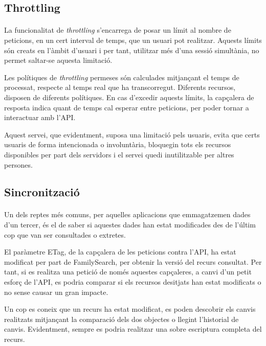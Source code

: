     \subsection{Throttling}

        \paragraph{}
        La funcionalitat de \emph{throttling} s'encarrega de posar un límit al nombre de peticions, en un cert interval de temps, que un usuari pot realitzar. Aquests límits són creats en l'àmbit d'usuari i per tant, utilitzar més d'una sessió simultània, no permet saltar-se aquesta limitació.

        Les polítiques de \emph{throttling} permeses són calculades mitjançant el temps de processat, respecte al temps real que ha transcorregut. Diferents recursos, disposen de diferents polítiques. En cas d'excedir aquests límits, la capçalera de resposta indica quant de temps cal esperar entre peticions, per poder tornar a interactuar amb l'API.

        Aquest servei, que evidentment, suposa una limitació pels usuaris, evita que certs usuaris de forma intencionada o involuntària, bloquegin tots els recursos disponibles per part dels servidors i el servei quedi inutilitzable per altres persones.


    \subsection{Sincronització}

        \paragraph{}
        Un dels reptes més comuns, per aquelles aplicacions que emmagatzemen dades d'un tercer, és el de saber si aquestes dades han estat modificades des de l'últim cop que van ser consultades o extretes.

        El paràmetre ETag, de la capçalera de les peticions contra l'API, ha estat modificat per part de FamilySearch, per obtenir la versió del recurs consultat. Per tant, si es realitza una petició de només aquestes capçaleres, a canvi d'un petit esforç de l'API, es podria comparar si els recursos desitjats han estat modificats o no sense causar un gran impacte.

        Un cop es coneix que un recurs ha estat modificat, es poden descobrir els canvis realitzats mitjançant la comparació dels dos objectes o llegint l'historial de canvis. Evidentment, sempre es podria realitzar una sobre escriptura completa del recurs.


